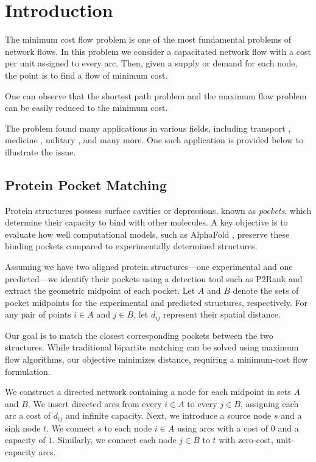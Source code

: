 \section{Introduction}

The minimum cost flow problem is one of the most fundamental problems of network flows. In this problem we consider a capacitated network flow with a cost per unit assigned to every arc. Then, given a supply or demand for each node, the point is to find a flow of minimum cost. 

One can observe that the shortest path problem and the maximum flow problem can be easily reduced to the minimum cost.

The problem found many applications in various fields, including transport \cite{krile2004}, medicine \cite{padfield2011}, military \cite{wegmuller2002}, and many more. One such application is provided below to illustrate the issue.

\subsection{Protein Pocket Matching}

Protein structures possess surface cavities or depressions, known as \textit{pockets}, which determine their capacity to bind with other molecules. A key objective is to evaluate how well computational models, such as AlphaFold \cite{alphafold-db}, preserve these binding pockets compared to experimentally determined structures. 

Assuming we have two aligned protein structures—one experimental and one predicted—we identify their pockets using a detection tool such as P2Rank \cite{p2rank} and extract the geometric midpoint of each pocket. Let $A$ and $B$ denote the sets of pocket midpoints for the experimental and predicted structures, respectively. For any pair of points $i \in A$ and $j \in B$, let $d_{ij}$ represent their spatial distance.

Our goal is to match the closest corresponding pockets between the two structures. While traditional bipartite matching can be solved using maximum flow algorithms, our objective minimizes distance, requiring a minimum-cost flow formulation. 

We construct a directed network containing a node for each midpoint in sets $A$ and $B$. We insert directed arcs from every $i \in A$ to every $j \in B$, assigning each arc a cost of $d_{ij}$ and infinite capacity. Next, we introduce a source node $s$ and a sink node $t$. We connect $s$ to each node $i \in A$ using arcs with a cost of $0$ and a capacity of $1$. Similarly, we connect each node $j \in B$ to $t$ with zero-cost, unit-capacity arcs.

